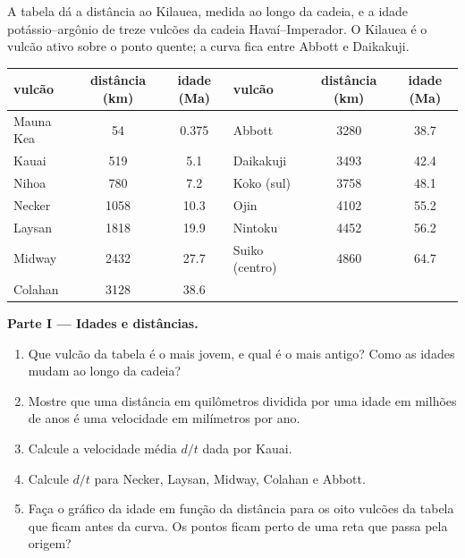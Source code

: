 \begin{problem}
\label{pb:g11:plate-motions:1}
A tabela dá a distância ao Kilauea, medida ao longo da cadeia, e a idade
potássio--argônio de treze vulcões da cadeia Havaí--Imperador. O Kilauea é
o vulcão ativo sobre o ponto quente; a curva fica entre Abbott e
Daikakuji.

\begin{center}
\small
\begin{tabular}{|l|c|c||l|c|c|}
\hline
vulcão & distância (\unit{km}) & idade (\unit{Ma}) & vulcão & distância (\unit{km}) & idade (\unit{Ma}) \\ \hline
Mauna Kea & 54 & 0.375 & Abbott & 3280 & 38.7 \\ \hline
Kauai & 519 & 5.1 & Daikakuji & 3493 & 42.4 \\ \hline
Nihoa & 780 & 7.2 & Koko (sul) & 3758 & 48.1 \\ \hline
Necker & 1058 & 10.3 & Ojin & 4102 & 55.2 \\ \hline
Laysan & 1818 & 19.9 & Nintoku & 4452 & 56.2 \\ \hline
Midway & 2432 & 27.7 & Suiko (centro) & 4860 & 64.7 \\ \hline
Colahan & 3128 & 38.6 & & & \\ \hline
\end{tabular}
\end{center}

\medskip
\noindent\textbf{Parte I --- Idades e distâncias.}
\begin{enumerate}
  \item Que vulcão da tabela é o mais jovem, e qual é o mais antigo? Como as
        idades mudam ao longo da cadeia?
  \item Mostre que uma distância em quilômetros dividida por uma idade em
        milhões de anos é uma velocidade em milímetros por ano.
  \item Calcule a velocidade média $d/t$ dada por Kauai.
  \item Calcule $d/t$ para Necker, Laysan, Midway, Colahan e Abbott.
  \item Faça o gráfico da idade em função da distância para os oito vulcões
        da tabela que ficam antes da curva. Os pontos ficam perto de uma reta que passa
        pela origem?
\end{enumerate}


\end{problem}
